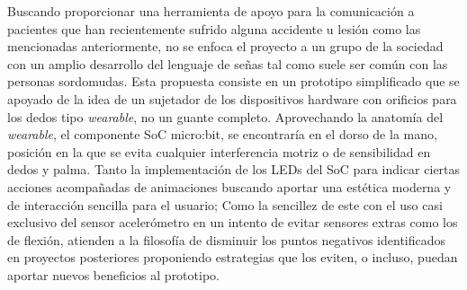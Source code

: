 \hfill \break
\justifying
Buscando proporcionar una herramienta de apoyo para la comunicación a pacientes que han recientemente sufrido alguna accidente u lesión como las mencionadas anteriormente, no se enfoca el proyecto a un grupo de la sociedad con un amplio desarrollo del lenguaje de señas tal como suele ser común con las personas sordomudas. Esta propuesta consiste en un prototipo simplificado que se apoyado de la idea de un sujetador de los dispositivos hardware con orificios para los dedos tipo \textit{wearable}, no un guante completo. Aprovechando la anatomía del \textit{wearable}, el componente SoC micro:bit, se encontraría en el dorso de la mano, posición en la que se evita cualquier interferencia motriz o de sensibilidad en dedos y palma.
Tanto la implementación de los LEDs del SoC para indicar ciertas acciones acompañadas de animaciones buscando aportar una estética moderna y de interacción sencilla para el usuario; Como la sencillez de este con el uso casi exclusivo del sensor acelerómetro en un intento de evitar sensores extras como los de flexión, atienden a la filosofía de disminuir los puntos negativos identificados en proyectos posteriores proponiendo estrategias que los eviten, o incluso, puedan aportar nuevos beneficios al prototipo.